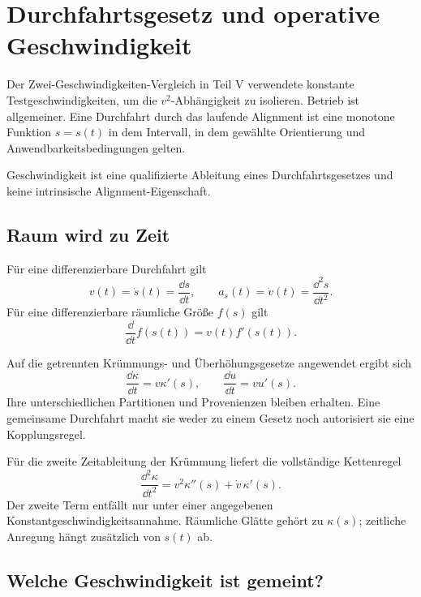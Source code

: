 \chapter{Durchfahrtsgesetz und operative Geschwindigkeit}
\label{chap:operational-velocity}

Der Zwei-Geschwindigkeiten-Vergleich in Teil V verwendete konstante
Testgeschwindigkeiten, um die \(v^2\)-Abhängigkeit zu isolieren. Betrieb ist
allgemeiner. Eine Durchfahrt durch das laufende Alignment ist eine monotone
Funktion \(s=s(t)\) in dem Intervall, in dem gewählte Orientierung und
Anwendbarkeitsbedingungen gelten.

\begin{principle}
\label{princ:velocity-runtime}
Geschwindigkeit ist eine qualifizierte Ableitung eines Durchfahrtsgesetzes und
keine intrinsische Alignment-Eigenschaft.
\end{principle}

\section{Raum wird zu Zeit}

\begin{definition}[Geschwindigkeitsbeziehung]
\label{def:velocity-relation}
Für eine differenzierbare Durchfahrt gilt
\[
v(t)=\dot s(t)=\frac{\dd s}{\dd t},
\qquad
a_s(t)=\dot v(t)=\frac{\dd^2s}{\dd t^2}.
\]
Für eine differenzierbare räumliche Größe \(f(s)\) gilt
\[
\frac{\dd}{\dd t}f(s(t))=v(t)f'(s(t)).
\]
\end{definition}

Auf die getrennten Krümmungs- und Überhöhungsgesetze angewendet ergibt sich
\[
\frac{\dd\kappa}{\dd t}=v\kappa'(s),
\qquad
\frac{\dd u}{\dd t}=v u'(s).
\]
Ihre unterschiedlichen Partitionen und Provenienzen bleiben erhalten. Eine
gemeinsame Durchfahrt macht sie weder zu einem Gesetz noch autorisiert sie eine
Kopplungsregel.

Für die zweite Zeitableitung der Krümmung liefert die vollständige Kettenregel
\begin{equation}
\frac{\dd^2\kappa}{\dd t^2}
=v^2\kappa''(s)+\dot v\,\kappa'(s).
\label{eq:curvature-second-time-derivative}
\end{equation}
Der zweite Term entfällt nur unter einer angegebenen
Konstantgeschwindigkeitsannahme. Räumliche Glätte gehört zu \(\kappa(s)\);
zeitliche Anregung hängt zusätzlich von \(s(t)\) ab.

\section{Welche Geschwindigkeit ist gemeint?}

